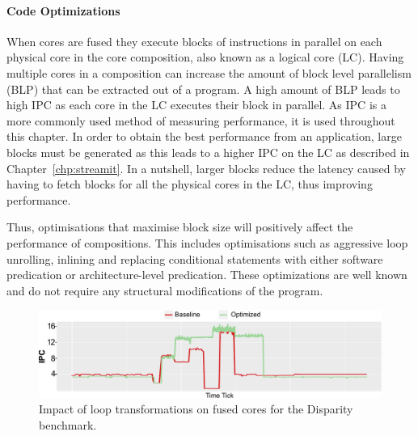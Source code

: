 \paragraph{Code Optimizations}

When cores are fused they execute blocks of instructions in parallel on each physical core in the core composition, also known as a logical core (LC).
Having multiple cores in a composition can increase the amount of block level parallelism (BLP) that can be extracted out of a program.
A high amount of BLP leads to high IPC as each core in the LC executes their block in parallel.
As IPC is a more commonly used method of measuring performance, it is used throughout this chapter.
In order to obtain the best performance from an application, large blocks must be generated as this leads to a higher IPC on the LC as described in Chapter~\ref{chp:streamit}.
In a nutshell, larger blocks reduce the latency caused by having to fetch blocks for all the physical cores in the LC, thus improving performance.

Thus, optimisations that maximise block size will positively affect the performance of compositions.
This includes optimisations such as aggressive loop unrolling, inlining and replacing conditional statements with either software predication or architecture-level predication.
These optimizations are well known and do not require any structural modifications of the program.

\begin{figure}[t]
    \includegraphics[width=\textwidth]{cases-paper/graphics/motivation/code_opt_3.pdf}
    \caption{Impact of loop transformations on fused cores for the Disparity benchmark.} 
    \label{fig:compmotiv}
\vspace{1em}
\end{figure}


